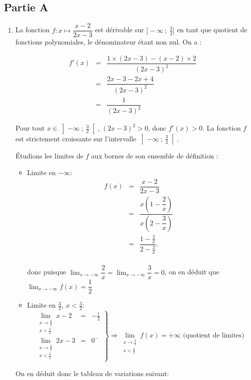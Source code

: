 \subsection*{Partie A}
\begin{enumerate}
\item La fonction $f:x \mapsto \dfrac{x-2}{2x-3}$ est dérivable sur $]-\infty~;~\frac32[$ en tant que quotient de fonctions polynomiales, le dénominateur étant non nul. On a :

\[\begin{array}{rcl}
f'(x) &=& \dfrac{1 \times (2x - 3) - (x - 2) \times 2}{(2x - 3)^2} \\
&=& \dfrac{2x - 3 - 2x + 4}{(2x - 3)^2}\\
&=& \dfrac{1}{(2x - 3)^2}
\end{array}\]

Pour tout $x \in \left]-\infty~;~\frac32\right[$,\: $(2x - 3)^2 > 0$, donc $f'(x) > 0$. La fonction $f$ est strictement croissante sur l'intervalle $\left]-\infty~;~\frac32\right[$.

Étudions les limites de $f$ aux bornes de son ensemble de définition :
\begin{itemize}
	\item Limite en $-\infty$: 
	\[\begin{matrix}
	f(x) &=&\dfrac{x-2}{2x-3} \\
	&=&\dfrac{x\left(1-\dfrac2{x}\right)}{x\left(2-\dfrac3{x}\right)}\\
	& =&\dfrac{1-\frac2{x}}{2-\frac3{x}}, \\
\end{matrix}\]

donc puisque $\displaystyle \lim_{x \to - \infty}\dfrac2{x} = \displaystyle \lim_{x \to - \infty}\dfrac3{x} = 0$, on en déduit que $\displaystyle \lim_{x \to - \infty} f(x)  = \dfrac12$ 

\item Limite en $\frac{3}{2}, \: x < \frac{3}{2}$: 
\[ 
\left.
\begin{matrix}
\displaystyle \lim_{\substack{x \to \frac32\\ x < \frac32}}x - 2 &=& -\frac12 \\
\displaystyle \lim_{\substack{x \to \frac32\\ x < \frac32}} 2x-3 &=& 0^-
\end{matrix}
\right\}
\Rightarrow \lim_{\substack{x \to \frac32\\ x < \frac32}} f(x)= +\infty \text{ (quotient de limites)} 
\]
\end{itemize}
On en déduit donc le tableau de variations suivant:


\end{enumerate}
